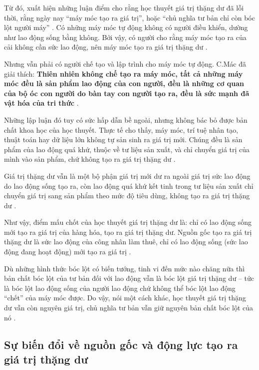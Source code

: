 Từ đó, xuất hiện những luận điểm cho rằng học thuyết giá trị thặng dư đã lỗi thời, rằng ngày nay ``máy móc tạo ra giá trị'', hoặc ``chủ nghĩa tư bản chỉ còn bóc lột người máy'' \cite{tran_hieu_gttd}. Có những máy móc tự động không có người điều khiển, dường như lao động sống bằng không. Bởi vậy, có người cho rằng máy móc tạo ra của cải không cần sức lao động, nên máy móc tạo ra giá trị thặng dư \cite{do_the_tung_gttd}.

Nhưng vẫn phải có người chế tạo và lập trình cho máy móc tự động. C.Mác đã giải thích: \textbf{Thiên nhiên không chế tạo ra máy móc, tất cả những máy móc đều là sản phẩm lao động của con người, đều là những cơ quan của bộ óc con người do bàn tay con người tạo ra, đều là sức mạnh đã vật hóa của tri thức} \cite{do_the_tung_gttd, marx_toantp_t46p2}.

Những lập luận đó tuy có sức hấp dẫn bề ngoài, nhưng không bác bỏ được bản chất khoa học của học thuyết. Thực tế cho thấy, máy móc, trí tuệ nhân tạo, thuật toán hay dữ liệu lớn không tự sản sinh ra giá trị mới. Chúng đều là sản phẩm của lao động quá khứ, thuộc về tư liệu sản xuất, và chỉ chuyển giá trị của mình vào sản phẩm, chứ không tạo ra giá trị thặng dư \cite{tran_hieu_gttd}.

Giá trị thặng dư vẫn là một bộ phận giá trị mới dư ra ngoài giá trị sức lao động do lao động sống tạo ra, còn lao động quá khứ kết tinh trong tư liệu sản xuất chỉ chuyển giá trị sang sản phẩm theo mức độ tiêu dùng, không tạo ra giá trị thặng dư \cite{do_the_tung_gttd}.

Như vậy, điểm mấu chốt của học thuyết giá trị thặng dư là: chỉ có lao động sống mới tạo ra giá trị của hàng hóa, tạo ra giá trị thặng dư. Nguồn gốc tạo ra giá trị thặng dư là sức lao động của công nhân làm thuê, chỉ có lao động sống (sức lao động đang hoạt động) mới tạo ra giá trị \cite{tran_hieu_gttd}.

Dù những hình thức bóc lột có biến tướng, tinh vi đến mức nào chăng nữa thì bản chất bóc lột của tư bản đối với lao động vẫn là bóc lột giá trị thặng dư -- tức là bóc lột lao động sống của người lao động chứ không thể bóc lột lao động ``chết'' của máy móc được. Do vậy, nói một cách khác, học thuyết giá trị thặng dư vẫn còn nguyên giá trị, chủ nghĩa tư bản vẫn giữ nguyên bản chất bóc lột của nó \cite{tran_hieu_gttd}.

\subsection{Sự biến đổi về nguồn gốc và động lực tạo ra giá trị thặng dư}

